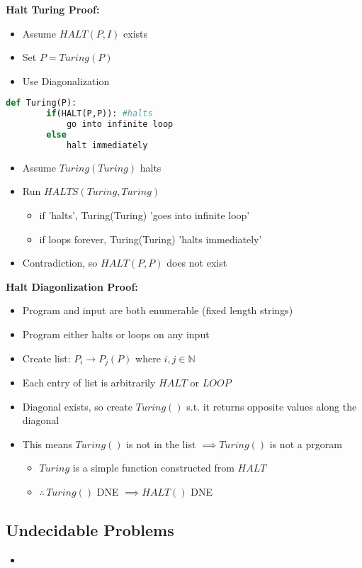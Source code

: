 \documentclass{article}\usepackage{amsmath,amssymb,amsthm,tikz,tkz-graph,color,chngpage,soul,hyperref,csquotes,graphicx,floatrow, listings}\newcommand*{\QEDB}{\hfill\ensuremath{\square}}\newtheorem*{prop}{Proposition}\renewcommand{\theenumi}{\alph{enumi}}\usepackage[shortlabels]{enumitem}\usepackage[nobreak=true]{mdframed}\usetikzlibrary{matrix,calc}\MakeOuterQuote{"}\usepackage[margin=0.75in]{geometry} \newtheorem{theorem}{Theorem}\newcommand{\Z}{\mathbb Z}\newcommand{\R}{\mathbb R}\newcommand{\Q}{\mathbb Q}\newcommand{\N}{\mathbb N}
\begin{document}
\begin{mdframed}
\textbf{Halt Turing Proof:}
\begin{itemize}
    \item Assume $HALT(P,I)$ exists
    \item Set $P = Turing(P)$
    \item Use Diagonalization
\end{itemize}
\begin{lstlisting}[language=Python]
    def Turing(P):
        if(HALT(P,P)): #halts
            go into infinite loop
        else
            halt immediately
\end{lstlisting}
\begin{itemize}
    \item Assume $Turing(Turing)$ halts
    \item Run $HALTS(Turing, Turing)$
    \begin{itemize}
        \item if 'halts', Turing(Turing) 'goes into infinite loop'
        \item if loops forever, Turing(Turing) 'halts immediately'
    \end{itemize}
    \item Contradiction, so $HALT(P,P)$ does not exist
\end{itemize}
\end{mdframed}

\begin{mdframed}
\textbf{Halt Diagonlization Proof:}
\begin{itemize}
    \item Program and input are both enumerable (fixed length strings)
    \item Program either halts or loops on any input
    \item Create list: $P_i \rightarrow {P_j(P)}$ where $i,j \in \N$ 
    \item Each entry of list is arbitrarily $HALT$ or $LOOP$
    \item Diagonal exists, so create $Turing()$ s.t. it returns opposite values along the diagonal
    \item This means $Turing()$ is not in the list $\implies Turing()$ is not a prgoram
    \begin{itemize}
        \item $Turing$ is a simple function constructed from $HALT$
        \item $\therefore\, Turing()$ DNE $\implies HALT()$ DNE
    \end{itemize}
\end{itemize}
\end{mdframed}

\subsection*{Undecidable Problems}
\begin{itemize}
    \item 
\end{itemize}
\end{document}
